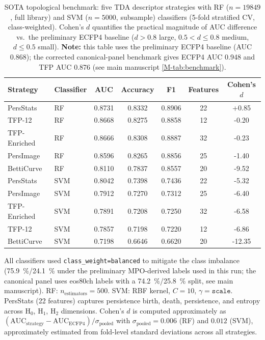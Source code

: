 \documentclass[11pt,a4paper]{article}
\begin{document}
\begin{table}[htbp]
\centering
\caption{SOTA topological benchmark: five TDA descriptor strategies with RF ($n = \num{19849}$, full library) and SVM ($n = 5000$, subsample) classifiers (5-fold stratified CV, class-weighted). Cohen's $d$ quantifies the practical magnitude of AUC difference vs.~the preliminary ECFP4 baseline ($d > 0.8$ large, $0.5 < d \leq 0.8$ medium, $d \leq 0.5$ small). \textbf{Note:} this table uses the preliminary ECFP4 baseline (AUC \num{0.868}); the corrected canonical-panel benchmark  gives ECFP4 AUC \num{0.948} and TFP AUC \num{0.876} (see main manuscript \cref{M-tab:benchmark}).}
\label{SM-tab:sota}
\begin{tabularx}{\textwidth}{l l S[table-format=1.4] S[table-format=1.4] S[table-format=1.4] S[table-format=1.0] S[table-format=+1.2]}
\toprule
{Strategy} & {Classifier} & {AUC} & {Accuracy} & {F1} & {Features} & {Cohen's $d$} \\
\midrule
PersStats & RF & 0.8731 & 0.8332 & 0.8906 & 22 & +0.85 \\
TFP-12 & RF & 0.8668 & 0.8275 & 0.8858 & 12 & -0.20 \\
TFP-Enriched & RF & 0.8666 & 0.8308 & 0.8887 & 32 & -0.23 \\
PersImage & RF & 0.8596 & 0.8265 & 0.8856 & 25 & -1.40 \\
BettiCurve & RF & 0.8110 & 0.7837 & 0.8557 & 20 & -9.52 \\
PersStats & SVM & 0.8042 & 0.7398 & 0.7436 & 22 & -5.32 \\
PersImage & SVM & 0.7912 & 0.7270 & 0.7312 & 25 & -6.40 \\
TFP-Enriched & SVM & 0.7891 & 0.7208 & 0.7250 & 32 & -6.58 \\
TFP-12 & SVM & 0.7857 & 0.7198 & 0.7220 & 12 & -6.86 \\
BettiCurve & SVM & 0.7198 & 0.6646 & 0.6620 & 20 & -12.35 \\
\bottomrule
\end{tabularx}
\vspace{1mm}
\footnotesize All classifiers used \texttt{class\_weight=balanced} to mitigate the class imbalance (\qty{75.9}{\percent}/\qty{24.1}{\percent} under the preliminary MPO-derived labels used in this run; the canonical panel uses eos80ch labels with a \qty{74.2}{\percent}/\qty{25.8}{\percent} split, see main manuscript). RF: $n_{\text{estimators}} = 500$. SVM: RBF kernel, $C = 10$, $\gamma = \texttt{scale}$. PersStats (22 features) captures persistence birth, death, persistence, and entropy across H$_0$, H$_1$, H$_2$ dimensions. Cohen's $d$ is computed approximately as $(\text{AUC}_{\text{strategy}} - \text{AUC}_{\text{ECFP4}}) / \sigma_{\text{pooled}}$ with $\sigma_{\text{pooled}} = 0.006$ (RF) and $0.012$ (SVM), approximately estimated from fold-level standard deviations across all strategies.
\end{table}
\end{document}
